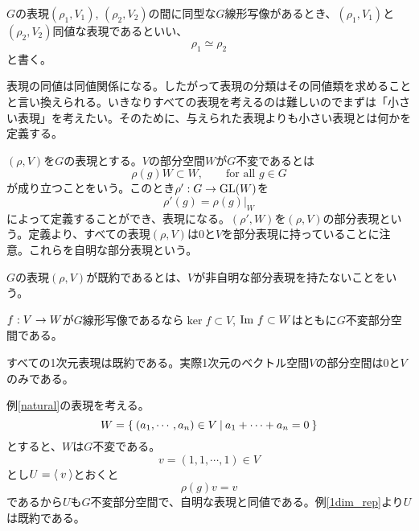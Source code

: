 \documentclass{ltjsreport}
\begin{document}
\begin{defin}
  $G$の表現$(\rho_1,V_1)$, $(\rho_2,V_2)$の間に同型な$G$線形写像があるとき、$(\rho_1,V_1)$と$(\rho_2,V_2)$同値な表現であるといい、
  \[
  \rho_1\simeq\rho_2  
  \]
  と書く。
\end{defin}

表現の同値は同値関係になる。したがって表現の分類はその同値類を求めることと言い換えられる。いきなりすべての表現を考えるのは難しいのでまずは「小さい表現」を考えたい。そのために、与えられた表現よりも小さい表現とは何かを定義する。

\begin{defin}
  $(\rho,V)$を$G$の表現とする。$V$の部分空間$W$が$G$不変であるとは
  \[
  \rho(g)W\subset W,\qquad \text{for all $g\in G$}  
  \]
  が成り立つことをいう。このとき$\rho':G\rightarrow\text{GL}(W)$を
  \[
  \rho'(g)=\rho(g)|_W  
  \]
  によって定義することができ、表現になる。$(\rho',W)$を$(\rho, V)$の部分表現という。定義より、すべての表現$(\rho, V)$は$0$と$V$を部分表現に持っていることに注意。これらを自明な部分表現という。
\end{defin}

\begin{defin}
  $G$の表現$(\rho, V)$が既約であるとは、$V$が非自明な部分表現を持たないことをいう。
\end{defin}

\begin{eg}\label{ker_im}
  $f:V\rightarrow W$が$G$線形写像であるなら$\ker f\subset V$, $\text{Im } f\subset W$はともに$G$不変部分空間である。
\end{eg}

\begin{eg}\label{1dim_rep}
  すべての1次元表現は既約である。実際1次元のベクトル空間$V$の部分空間は$0$と$V$のみである。
\end{eg}

\begin{eg}
  例\ref{natural}の表現を考える。
  \[
  W=\left\{\:(a_1,\cdots,a_n)\in V\:\middle|\:a_1+\cdots+a_n=0\:\right\}  
  \]
  とすると、$W$は$G$不変である。
  \[
  v=(1,1,\cdots,1)\in V  
  \]
  とし$U=\langle\:v\:\rangle$とおくと
  \[
  \rho(g)v=v  
  \]
  であるから$U$も$G$不変部分空間で、自明な表現と同値である。例\ref{1dim_rep}より$U$は既約である。
\end{eg}
\end{document}
